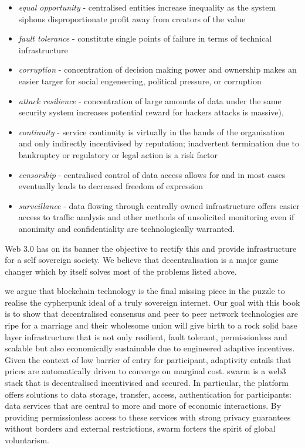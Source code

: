 \begin{itemize}
    \item \emph{equal opportunity} - centralised entities increase inequality as the system siphons disproportionate profit away from creators of the value
    \item \emph{fault tolerance} - constitute single points of failure in terms of technical infrastructure 
    \item \emph{corruption} - concentration of decision making power and ownership makes an easier targer for social engeneering, political pressure, or corruption 
    \item \emph{attack resilience} - concentration of large amounts of data under the same security system increases potential reward for hackers attacks is massive), 
    \item \emph{continuity} - service continuity is virtually in the hands of the organisation and only indirectly incentivised by reputation; inadvertent termination due to bankruptcy or regulatory or legal action is a risk factor    
    \item \emph{censorship} - centralised control of data access allows for and in most cases eventually leads to decreased freedom of expression
    \item \emph{surveillance} - data flowing through centrally owned infrastructure offers easier access to traffic analysis and other methods of unsolicited monitoring even if anonimity and confidentiality are technologically warranted.
\end{itemize}

Web 3.0 has on its banner the objective to rectify this and provide infrastructure for a self sovereign society. We believe that decentralisation is a major game changer which by itself solves most of the problems listed above.

we argue that blockchain technology is the final missing piece in the puzzle to realise the cypherpunk ideal of a truly sovereign internet. Our goal with this book is to show that decentralised consensus and peer to peer network technologies are ripe for a  marriage and their wholesome union will give birth to a rock solid base layer infrastructure that is not only resilient, fault tolerant, permissionless and scalable but also economically sustainable due to engineered adaptive incentives. Given the context of low barrier of entry for participant, adaptivity entails that prices are automatically driven to converge on marginal cost.
swarm is a web3 stack that is decentralised incentivised and secured. In particular, the platform offers solutions to data storage, transfer, access, authentication  for participants: data services that are central to more and more of economic interactions. By providing permissionless access to these services with strong privacy guarantees without borders and external restrictions,
swarm forters the spirit of global voluntarism.









